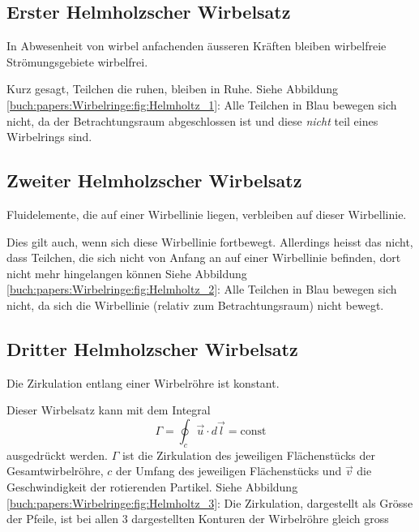 \subsection{Erster Helmholzscher Wirbelsatz}

\begin{satz}
    In Abwesenheit von wirbel anfachenden äusseren Kräften bleiben wirbelfreie Strömungsgebiete wirbelfrei.
\end{satz}

Kurz gesagt, Teilchen die ruhen, bleiben in Ruhe. 
Siehe Abbildung \ref{buch:papers:Wirbelringe:fig:Helmholtz_1}: 
Alle Teilchen in Blau bewegen sich nicht, da der Betrachtungsraum abgeschlossen ist und diese {\em nicht} teil eines Wirbelrings sind.

\subsection{Zweiter Helmholzscher Wirbelsatz}

\begin{satz}
    Fluidelemente, die auf einer Wirbellinie liegen, verbleiben auf dieser Wirbellinie.
\end{satz}

Dies gilt auch, wenn sich diese Wirbellinie fortbewegt. 
Allerdings heisst das nicht, dass Teilchen, die sich nicht von Anfang an auf einer Wirbellinie befinden, dort nicht mehr hingelangen können
Siehe Abbildung \ref{buch:papers:Wirbelringe:fig:Helmholtz_2}:  
Alle Teilchen in Blau bewegen sich nicht, da sich die Wirbellinie (relativ zum Betrachtungsraum) nicht bewegt.

\subsection{Dritter Helmholzscher Wirbelsatz}

\begin{satz}
    Die Zirkulation entlang einer Wirbelröhre ist konstant. 
\end{satz}

Dieser Wirbelsatz kann mit dem Integral 
\[
\Gamma
= 
\oint_{c} \vec{u} \cdot d \vec{l}
=
\text{const}
\]
ausgedrückt werden. 
\(\Gamma\) ist die Zirkulation des jeweiligen Flächenstücks der Gesamtwirbelröhre, \(c\) der Umfang des jeweiligen Flächenstücks und \(\vec{v}\) die Geschwindigkeit der rotierenden Partikel. 
Siehe Abbildung \ref{buch:papers:Wirbelringe:fig:Helmholtz_3}: 
Die Zirkulation, dargestellt als Grösse der Pfeile, ist bei allen 3 dargestellten Konturen der Wirbelröhre gleich gross 


